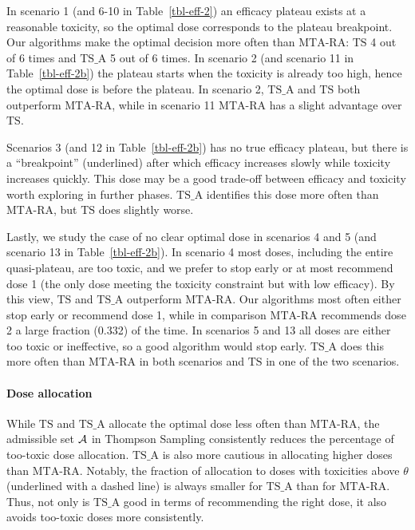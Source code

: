 In scenario 1 (and 6-10 in Table~\ref{tbl-eff-2}) an efficacy plateau exists at a reasonable toxicity, so the optimal dose corresponds to the plateau breakpoint. Our algorithms make the optimal decision more often than $\mathrm{MTA}$-$\mathrm{RA}$: $\mathrm{TS}$ 4 out of 6 times and $\mathrm{TS}\_\mathrm{A}$ 5 out of 6 times. In scenario 2 (and scenario 11 in Table~\ref{tbl-eff-2b}) the plateau starts when the toxicity is already too high, hence the optimal dose is before the plateau. In scenario 2,  $\mathrm{TS}\_\mathrm{A}$ and $\mathrm{TS}$ both outperform $\mathrm{MTA}$-$\mathrm{RA}$, while in scenario 11 $\mathrm{MTA}$-$\mathrm{RA}$ has a slight advantage over $\mathrm{TS}$. 

Scenarios 3 (and 12 in Table~\ref{tbl-eff-2b}) has no true efficacy plateau, but there is a ``breakpoint'' (underlined) after which efficacy increases slowly while toxicity increases quickly. This dose may be a good trade-off between efficacy and toxicity worth exploring in further phases. $\mathrm{TS}\_\mathrm{A}$ identifies this dose more often than $\mathrm{MTA}$-$\mathrm{RA}$, but $\mathrm{TS}$ does slightly worse. 

Lastly, we study the case of no clear optimal dose in scenarios 4 and 5 (and scenario 13 in Table~\ref{tbl-eff-2b}). In scenario 4 most doses, including the entire quasi-plateau, are too toxic, and we prefer to stop early or at most recommend dose 1 (the only dose meeting the toxicity constraint but with low efficacy). By this view, $\mathrm{TS}$ and $\mathrm{TS}\_\mathrm{A}$ outperform $\mathrm{MTA}$-$\mathrm{RA}$. Our algorithms most often either stop early or recommend dose 1, while in comparison $\mathrm{MTA}$-$\mathrm{RA}$ recommends dose 2 a large fraction (0.332) of the time. In scenarios 5 and 13 all doses are either too toxic or ineffective, so a good algorithm would stop early. %
$\mathrm{TS}\_\mathrm{A}$ does this more often than $\mathrm{MTA}$-$\mathrm{RA}$ in both scenarios and $\mathrm{TS}$ in one of the two scenarios. 



\paragraph{Dose allocation}
While $\mathrm{TS}$ and $\mathrm{TS}\_\mathrm{A}$ allocate the optimal dose less often than $\mathrm{MTA}$-$\mathrm{RA}$, the admissible set $\mathcal{A}$ in Thompson Sampling consistently reduces the percentage of too-toxic dose allocation. $\mathrm{TS}\_\mathrm{A}$ is also more cautious in allocating higher doses than $\mathrm{MTA}$-$\mathrm{RA}$. Notably, the fraction of allocation to doses with toxicities above $\theta$ (underlined with a dashed line) is always smaller for $\mathrm{TS}\_\mathrm{A}$ than for $\mathrm{MTA}$-$\mathrm{RA}$. Thus, not only is $\mathrm{TS}\_\mathrm{A}$ good in terms of recommending the right dose, it also avoids too-toxic doses more consistently.

